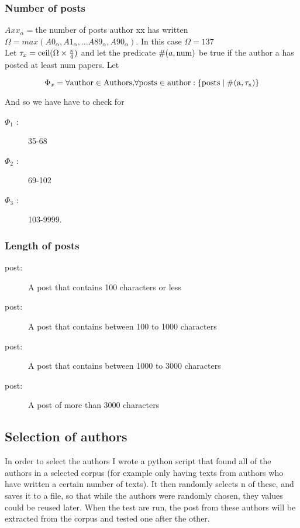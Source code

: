 \subsubsection*{Number of posts}
$Axx_{\alpha} = $the number of posts author xx has written\\ 
$\Omega = max(A0_\alpha, A1_\alpha, \ldots A89_\alpha, A90_\alpha)$. In this case $\Omega = 137$\\

Let $\tau_x = \rm{ceil}(\Omega \times \frac{x}{4})$ and let the predicate $\#(a, \rm{num})$ be true if the author a has posted at least num papers. Let 

$$\Phi_x = \forall\rm{ author }\in\rm{ Authors, }\forall\rm{ posts }\in\rm{ author }: \{\rm{posts }\mid \#(a, \tau_x)\}$$ 
 
And so we have have to check for 
\begin{description}
\item[$\Phi_1$ :] 35-68
\item[$\Phi_2$ :] 69-102
\item[$\Phi_3$ :] 103-9999.
\end{description}

\subsubsection*{Length of posts}

\begin{description}
\item[ post:] A post that contains 100 characters or less
\item[ post:] A post that contains between 100 to 1000 characters
\item[ post:] A post that contains between 1000 to 3000 characters
\item[ post:] A post of more than 3000 characters
\end{description}

\subsection{Selection of authors}
In order to select the authors I wrote a python script that found all of the authors in a selected corpus (for example only having texts from authors who have written a certain number of texts). It then randomly selects n of these, and saves it to a file, so that while the authors were randomly chosen, they values could be reused later. When the test are run, the post from these authors will be extracted from the corpus and tested one after the other.

